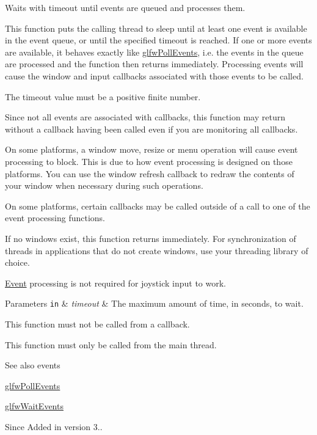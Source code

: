 Waits with timeout until events are queued and processes them. 

This function puts the calling thread to sleep until at least one event is available in the event queue, or until the specified timeout is reached. If one or more events are available, it behaves exactly like \hyperlink{group__window_ga872d16e4c77f58c0436f356255920cfc}{glfw\+Poll\+Events}, i.\+e. the events in the queue are processed and the function then returns immediately. Processing events will cause the window and input callbacks associated with those events to be called.

The timeout value must be a positive finite number.

Since not all events are associated with callbacks, this function may return without a callback having been called even if you are monitoring all callbacks.

On some platforms, a window move, resize or menu operation will cause event processing to block. This is due to how event processing is designed on those platforms. You can use the window refresh callback to redraw the contents of your window when necessary during such operations.

On some platforms, certain callbacks may be called outside of a call to one of the event processing functions.

If no windows exist, this function returns immediately. For synchronization of threads in applications that do not create windows, use your threading library of choice.

\hyperlink{classEvent}{Event} processing is not required for joystick input to work.


\begin{DoxyParams}[1]{Parameters}
\mbox{\tt in}  & {\em timeout} & The maximum amount of time, in seconds, to wait.\\
\hline
\end{DoxyParams}
This function must not be called from a callback.

This function must only be called from the main thread.

\begin{DoxySeeAlso}{See also}
events 

\hyperlink{group__window_ga872d16e4c77f58c0436f356255920cfc}{glfw\+Poll\+Events} 

\hyperlink{group__window_ga6e042d05823c11e11c7339b81a237738}{glfw\+Wait\+Events}
\end{DoxySeeAlso}
\begin{DoxySince}{Since}
Added in version 3.. 
\end{DoxySince}
\mbox{\label{group__window_ga69c40728499720bef8a49aa925ea0efa}} 
